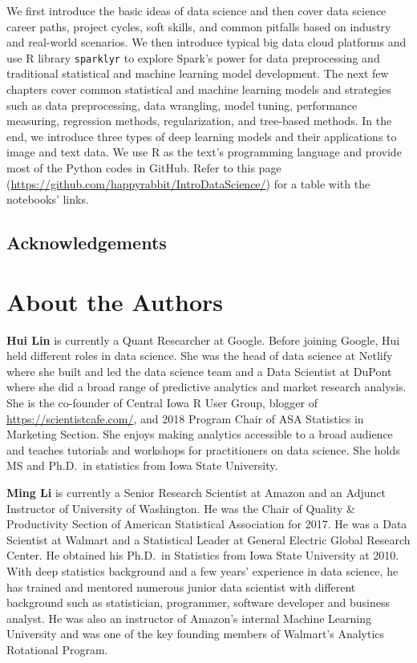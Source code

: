 \documentclass[12pt,]{krantz}
\begin{document}
We first introduce the basic ideas of data science and then cover data science career paths, project cycles, soft skills, and common pitfalls based on industry and real-world scenarios. We then introduce typical big data cloud platforms and use R library \texttt{sparklyr}  to explore Spark's power for data preprocessing and traditional statistical and machine learning model development. The next few chapters cover common statistical and machine learning models and strategies such as data preprocessing, data wrangling, model tuning, performance measuring, regression methods, regularization, and tree-based methods. In the end, we introduce three types of deep learning models and their applications to image and text data. We use R as the text's programming language and provide most of the Python codes in GitHub. Refer to this page (\url{https://github.com/happyrabbit/IntroDataScience/}) for a table with the notebooks' links.

\hypertarget{acknowledgements}{%
\section*{Acknowledgements}\label{acknowledgements}}


\hypertarget{about-the-authors}{%
\chapter*{About the Authors}\label{about-the-authors}}


\textbf{Hui Lin} is currently a Quant Researcher at Google. Before joining Google, Hui held
different roles in data science. She was the head of data science at Netlify where she built
and led the data science team and a Data Scientist at DuPont where she did a broad range
of predictive analytics and market research analysis. She is the co-founder of Central
Iowa R User Group, blogger of \url{https://scientistcafe.com/}, and 2018 Program Chair of
ASA Statistics in Marketing Section. She enjoys making analytics accessible to a broad
audience and teaches tutorials and workshops for practitioners on data science. She holds
MS and Ph.D.~in statistics from Iowa State University.

\textbf{Ming Li} is currently a Senior Research Scientist at Amazon and an Adjunct Instructor of University of Washington. He was the Chair of Quality \& Productivity Section of American Statistical Association for 2017. He was a Data Scientist at Walmart and a Statistical Leader at General Electric Global Research Center. He obtained his Ph.D.~in Statistics from Iowa State University at 2010. With deep statistics background and a few years' experience in data science, he has trained and mentored numerous junior data scientist with different background such as statistician, programmer, software developer and business analyst. He was also an instructor of Amazon's internal Machine Learning University and was one of the key founding members of Walmart's Analytics Rotational Program.
\end{document}
